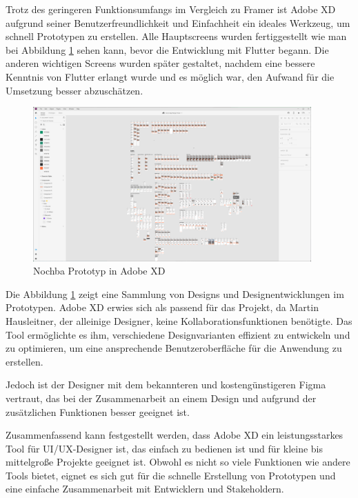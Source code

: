 Trotz des geringeren Funktionsumfangs im Vergleich zu Framer
ist Adobe XD aufgrund seiner Benutzerfreundlichkeit und
Einfachheit ein ideales Werkzeug, um schnell Prototypen zu
erstellen. Alle Hauptscreens wurden fertiggestellt wie man
bei Abbildung \ref{fig:adobexd-prototyp} sehen kann, bevor
die Entwicklung mit Flutter begann. Die anderen wichtigen
Screens wurden später gestaltet, nachdem eine bessere
Kenntnis von Flutter erlangt wurde und es möglich war, den
Aufwand für die Umsetzung besser abzuschätzen.

\begin{figure}[h]
  \centering
  \includegraphics[width=0.95\textwidth]{pics/nochba-adobe-xd-protoype-screenshot.png}
  \caption{Nochba Prototyp in Adobe XD}
  \label{fig:adobexd-prototyp}
\end{figure}

Die Abbildung \ref{fig:adobexd-prototyp} zeigt eine Sammlung von Designs und Designentwicklungen im Prototypen. Adobe XD erwies sich als passend für das Projekt, da Martin Hausleitner, der alleinige Designer, keine Kollaborationsfunktionen benötigte. Das Tool ermöglichte es ihm, verschiedene Designvarianten effizient zu entwickeln und zu optimieren, um eine ansprechende Benutzeroberfläche für die Anwendung zu erstellen.

Jedoch ist der Designer mit
dem bekannteren und kostengünstigeren Figma vertraut, das
bei der Zusammenarbeit an einem Design und aufgrund der
zusätzlichen Funktionen besser geeignet ist.

Zusammenfassend kann festgestellt werden, dass Adobe XD ein leistungsstarkes Tool für UI/UX-Designer ist, das einfach zu bedienen ist und für kleine bis mittelgroße Projekte geeignet ist. Obwohl es nicht so viele Funktionen wie andere Tools bietet, eignet es sich gut für die schnelle Erstellung von Prototypen und eine einfache Zusammenarbeit mit Entwicklern und Stakeholdern.

